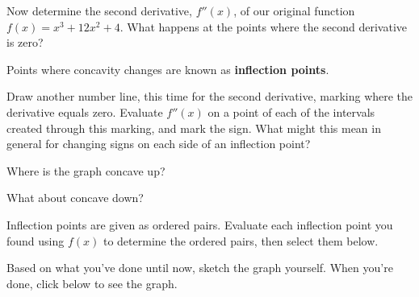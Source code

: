 \documentclass{ximera}
\begin{document}
\begin{question}

Now determine the second derivative, $f''(x)$, of our original function $f(x) = x^3 + 12x^2+4$. What happens at the points where the second derivative is zero?

\begin{multipleChoice}
\end{multipleChoice}
\vspace{10mm}

Points where concavity changes are known as \textbf{inflection points}.

Draw another number line, this time for the second derivative, marking where the derivative equals zero. Evaluate $f''(x)$ on a point of each of the intervals created through this marking, and mark the sign. What might this mean in general for changing signs on each side of an inflection point?

\begin{selectAll}
\end{selectAll}
\vspace{5mm}
Where is the graph concave up?
\begin{multipleChoice}
\choice{$[0,1]$}
\choice{$[0,260]$}
\choice{$[4,260]$}
\end{multipleChoice}
\vspace{5mm}
What about concave down?

\begin{multipleChoice}
\choice{$[0,1]$}
\choice{$[-4, \infty)$}
\choice{$[0,260]$}
\choice{$[4,260]$}
\end{multipleChoice}
\vspace{5mm}

Inflection points are given as ordered pairs. Evaluate each inflection point you found using $f(x)$ to determine the ordered pairs, then select them below.
\begin{selectAll}
\end{selectAll}
\vspace{5mm}
Based on what you've done until now, sketch the graph yourself. When you're done, click below to see the graph.


\end{question}
\end{document}
